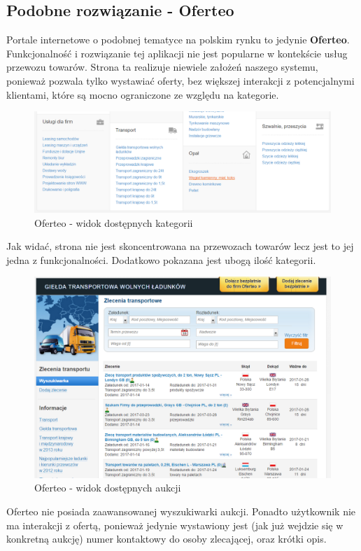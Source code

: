 \documentclass[10pt,titlepage]{article} %
\begin{document}
\subsection{Podobne rozwiązanie - Oferteo}
Portale internetowe o podobnej tematyce na polskim rynku to jedynie \textbf{Oferteo}. 
Funkcjonalność i rozwiązanie tej aplikacji nie jest popularne w kontekście usług przewozu towarów. Strona ta realizuje niewiele założeń naszego systemu, ponieważ pozwala tylko wystawiać oferty, bez większej interakcji z potencjalnymi klientami, które są mocno ograniczone ze względu na kategorie.

\begin{figure}[H]
\includegraphics[width=\textwidth]{img/sekcja1/oferteoKategorie}
\caption[Oferteo - widok dostępnych kategorii]{Oferteo - widok dostępnych kategorii\cite{oferteo}}
\end{figure}
Jak widać, strona nie jest skoncentrowana na przewozach towarów lecz jest to jej jedna z funkcjonalności. Dodatkowo pokazana jest ubogą ilość kategorii.

\begin{figure}[H]
\includegraphics[width=\textwidth]{img/sekcja1/oferteoWidok}
\caption[Oferteo - widok dostępnych aukcji]{Oferteo - widok dostępnych aukcji}
\end{figure}
Oferteo nie posiada zaawansowanej wyszukiwarki aukcji. Ponadto użytkownik nie ma interakcji z ofertą, ponieważ jedynie wystawiony jest (jak już wejdzie się w konkretną aukcję) numer kontaktowy do osoby zlecającej, oraz krótki opis.
\end{document}
